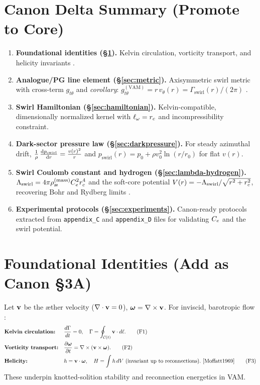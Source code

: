 \documentclass[11pt]{article}
\begin{document}
    \section*{Canon Delta Summary (Promote to Core)}
    \begin{enumerate}
        \item \textbf{Foundational identities (\S\ref{sec:foundational-identities}).} Kelvin circulation, vorticity transport, and helicity invariants \cite{Helmholtz1858,Kelvin1869,Moffatt1969,Batchelor1967,LandauLifshitz1987}.
        \item \textbf{Analogue/PG line element (\S\ref{sec:metric}).} Axisymmetric swirl metric with cross-term \(g_{t\theta}\) and \emph{corollary}: \(g^{(\mathrm{VAM})}_{t\theta}= r\,v_\theta(r) = \Gamma_{\text{swirl}}(r)/(2\pi)\) \cite{Unruh1981,Visser1998,Painleve1921,Gullstrand1922,Kerr1963}.
        \item \textbf{Swirl Hamiltonian (\S\ref{sec:hamiltonian}).} Kelvin-compatible, dimensionally normalized kernel with \(\ell_\omega=r_c\) and incompressibility constraint.
        \item \textbf{Dark-sector pressure law (\S\ref{sec:darkpressure}).} For steady azimuthal drift, \( \frac{1}{\rho}\,\dv{p_{\text{swirl}}}{r} = \frac{v(r)^2}{r}\) and \(p_{\text{swirl}}(r)=p_0+\rho v_0^2\ln(r/r_0)\) for flat \(v(r)\).
        \item \textbf{Swirl Coulomb constant and hydrogen (\S\ref{sec:lambda-hydrogen}).} \(\displaystyle \Lam = 4\pi \aeMass \Ce^2 \rc^4\) and the soft-core potential \(V(r)=-\Lambda_{\text{swirl}}/\sqrt{r^2+r_c^2}\), recovering Bohr and Rydberg limits \cite{Jackson1999,Schrodinger1926}.
        \item \textbf{Experimental protocols (\S\ref{sec:experiments}).} Canon-ready protocols extracted from \texttt{appendix\_C} and \texttt{appendix\_D} files for validating \(C_e\) and the swirl potential.
    \end{enumerate}

    \section{Foundational Identities (Add as Canon \S3A)}
    \label{sec:foundational-identities}
    Let \(\vb v\) be the æther velocity (\(\nabla\cdot \vb v=0\)), \(\bm{\omega}=\nabla\times \vb v\). For inviscid, barotropic flow \cite{Helmholtz1858,Kelvin1869,Batchelor1967,LandauLifshitz1987}:
    \begin{align}
        &\textbf{Kelvin circulation:} && \frac{d\Gamma}{dt}=0,\quad \Gamma=\oint_{\mathcal{C}(t)} \vb v\cdot d\vb \ell. \tag{F1} \label{eq:kelvin} \\
        &\textbf{Vorticity transport:} && \pdv{\bm{\omega}}{t} = \nabla\times(\vb v\times \bm{\omega}). \tag{F2} \label{eq:vorticity-transport}\\
        &\textbf{Helicity:} && h=\vb v\cdot \bm{\omega},\quad H=\int h\, dV\ \text{(invariant up to reconnections)}.~\cite{Moffatt1969} \tag{F3}\label{eq:helicity}
    \end{align}
    These underpin knotted-solition stability and reconnection energetics in VAM.
\end{document}
